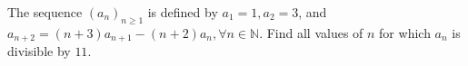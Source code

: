 The sequence $ (a_{n})_{n\geq 1}$ is defined by $ a_{1} = 1, a_{2} = 3$,  and $ a_{n + 2} = (n + 3)a_{n + 1} - (n + 2)a_{n}, \forall n \in \mathbb{N}$. Find all values of $ n$ for which $ a_{n}$ is divisible by $ 11$.